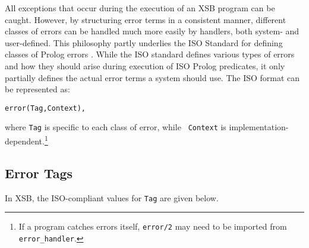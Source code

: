 All exceptions that occur during the execution of an XSB program can
be caught.  However, by structuring error terms in a consistent
manner, different classes of errors can be handled much more easily by
handlers, both system- and user-defined.  This philosophy partly
underlies the ISO Standard for defining classes of Prolog errors
\cite{ISO-Prolog}.  While the ISO standard defines various types of
errors and how they should arise during execution of ISO Prolog
predicates, it only partially defines the actual error terms a system
should use.  The ISO format can be represented as:

\begin{center}
{\tt error(Tag,Context), }
\end{center}

\noindent
where {\tt Tag} is specific to each class of error, while {\tt
  Context} is implementation-dependent.\footnote{If a program catches
  errors itself, {\tt error/2} may need to be imported from {\tt
    error\_handler}.}

\subsection{Error Tags}

In XSB, the ISO-compliant values for {\tt Tag} are given below.

